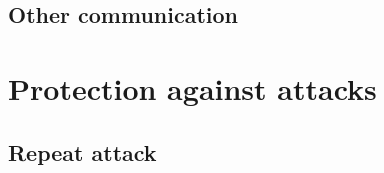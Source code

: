 \subsection{Other communication}
\label{subsec:other_phase}


\section{Protection against attacks}
\label{sec:attacks_protection}


\subsection{Repeat attack}
\label{subsec:repeat_attack}

